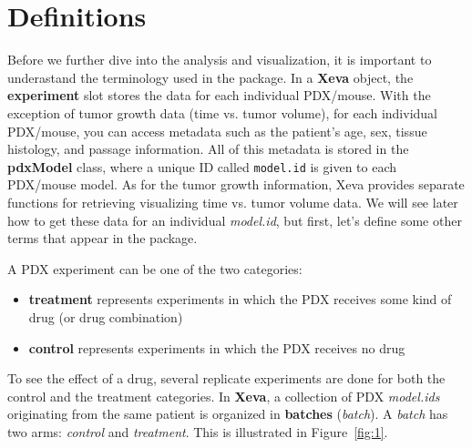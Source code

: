 \documentclass{article}\usepackage[]{graphicx}\usepackage[usenames,dvipsnames]{color}
\begin{document}
\section{Definitions}
Before we further dive into the analysis and visualization, it is important to underastand the terminology used in the  package.
In a \textbf{Xeva} object, the \textbf{experiment} slot stores the data for each individual PDX/mouse. With the exception of tumor growth data (time vs. tumor volume), for each individual PDX/mouse, you can access metadata such as the patient's age, sex, tissue histology, and passage information.
All of this metadata is stored in the \textbf{pdxModel} class, where a unique ID called \texttt{model.id} is given to each PDX/mouse model. As for the tumor growth information, Xeva provides separate functions for retrieving visualizing time vs. tumor volume data.
We will see later how to get these data for an individual \textit{model.id}, but first, let's define some other terms that appear in the  package.

A PDX experiment can be one of the two categories:
\begin{itemize}
  \item \textbf{treatment} represents experiments in which the PDX receives some kind of drug (or drug combination)
  \item \textbf{control} represents experiments in which the PDX receives no drug
\end{itemize}

To see the effect of a drug, several replicate experiments are done for both the control and the treatment categories.
In \textbf{Xeva}, a collection of PDX \textit{model.ids} originating from the same patient is organized in \textbf{batches} (\textit{batch}). A \textit{batch} has two arms: \textit{control} and \textit{treatment}. This is illustrated in Figure~\ref{fig:1}.
\end{document}
